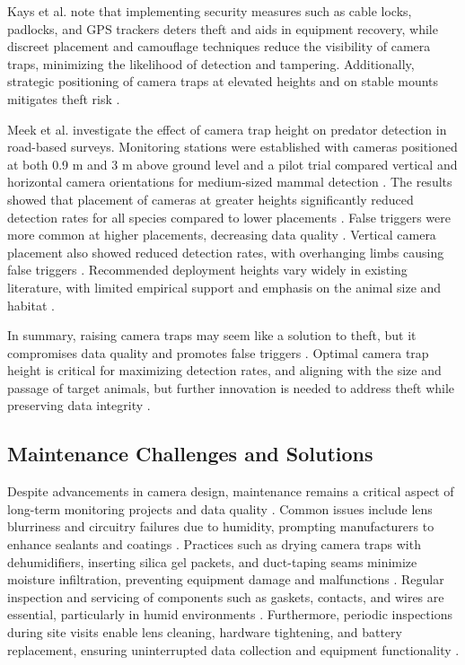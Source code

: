 \documentclass[class=report,11pt,crop=false]{standalone}
\begin{document}
Kays et al. \cite{kays2009camera} note that implementing security measures such as cable locks, padlocks, and GPS trackers deters theft and aids in equipment recovery, while discreet placement and camouflage techniques reduce the visibility of camera traps, minimizing the likelihood of detection and tampering. Additionally, strategic positioning of camera traps at elevated heights and on stable mounts mitigates theft risk \cite{kays2009camera}. 

Meek et al. \cite{meek2016higher} investigate the effect of camera trap height on predator detection in road-based surveys. Monitoring stations were established with cameras positioned at both 0.9 m and 3 m above ground level and a pilot trial compared vertical and horizontal camera orientations for medium-sized mammal detection \cite{meek2016higher}. The results showed that placement of cameras at greater heights significantly reduced detection rates for all species compared to lower placements \cite{meek2016higher}. False triggers were more common at higher placements, decreasing data quality \cite{meek2016higher}. Vertical camera placement also showed reduced detection rates, with overhanging limbs causing false triggers \cite{meek2016higher}. Recommended deployment heights vary widely in existing literature, with limited empirical support and emphasis on the animal size and habitat \cite{meek2016higher}. 

In summary, raising camera traps may seem like a solution to theft, but it compromises data quality and promotes false triggers \cite{meek2016higher}. Optimal camera trap height is critical for maximizing detection rates, and aligning with the size and passage of target animals, but further innovation is needed to address theft while preserving data integrity \cite{meek2016higher}. 

\subsection{Maintenance Challenges and Solutions}

Despite advancements in camera design, maintenance remains a critical aspect of long-term monitoring projects and data quality \cite{kays2009camera}. Common issues include lens blurriness and circuitry failures due to humidity, prompting manufacturers to enhance sealants and coatings \cite{kays2009camera}. Practices such as drying camera traps with dehumidifiers, inserting silica gel packets, and duct-taping seams minimize moisture infiltration, preventing equipment damage and malfunctions \cite{glover2019camera}.  Regular inspection and servicing of components such as gaskets, contacts, and wires are essential, particularly in humid environments \cite{glover2019camera}. Furthermore, periodic inspections during site visits enable lens cleaning, hardware tightening, and battery replacement, ensuring uninterrupted data collection and equipment functionality \cite{glover2019camera}. 
\end{document}
